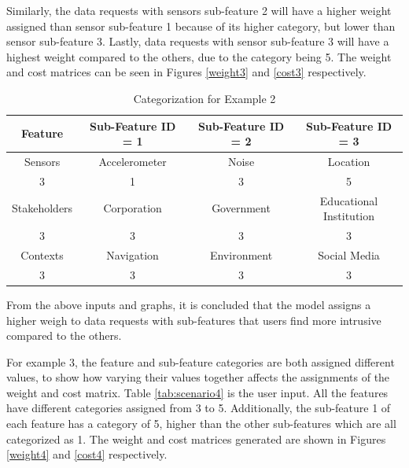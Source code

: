 Similarly, the data requests with sensors sub-feature 2 will have a higher weight assigned than sensor sub-feature 1 because of its higher category, but lower than sensor sub-feature 3. Lastly, data requests with sensor sub-feature 3 will have a highest weight compared to the others, due to the category being 5. The weight and cost matrices can be seen in Figures \ref{weight3} and \ref{cost3} respectively.

\begin{table}[h!]
  \centering
  \caption{Categorization for Example 2}
  \label{tab:scenario3}
  \begin{tabular}{cccc}
    \toprule
    Feature & Sub-Feature ID = 1 & Sub-Feature ID = 2 & Sub-Feature ID = 3\\
    \midrule
    Sensors & Accelerometer & Noise & Location\\
     3 & 1 & 3 & 5\\ \hhline{====}
     Stakeholders & Corporation & Government & Educational Institution\\
     3 & 3 & 3 & 3\\ \hhline{====}
     Contexts & Navigation & Environment & Social Media\\
     3 & 3 & 3 & 3\\ 
    \bottomrule
  \end{tabular}
\end{table}

% 


%


From the above inputs and graphs, it is concluded that the model assigns a higher weigh to data requests with sub-features that users find more intrusive compared to the others.

For example 3, the feature and sub-feature categories are both assigned different values, to show how varying their values together affects the assignments of the weight and cost matrix. Table \ref{tab:scenario4} is the user input. All the features have different categories assigned from 3 to 5. Additionally, the sub-feature 1 of each feature has a category of 5, higher than the other sub-features which are all categorized as 1. The weight and cost matrices generated are shown in Figures \ref{weight4} and \ref{cost4} respectively. 

